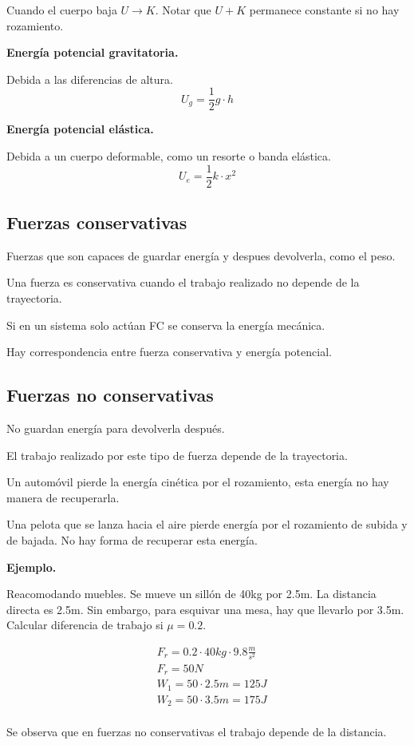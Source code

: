 \documentclass{article}
\begin{document}
Cuando el cuerpo baja \(U \rightarrow K\).
Notar que \(U + K\) permanece constante si no hay rozamiento.

\textbf{Energía potencial gravitatoria.}

Debida a las diferencias de altura.
\[U_g = \frac{1}{2} g \cdot h\]

\textbf{Energía potencial elástica.}

Debida a un cuerpo deformable, como un resorte o banda elástica.
\[U_e = \frac{1}{2} k \cdot x^2\]

\subsection{Fuerzas conservativas}

Fuerzas que son capaces de guardar energía y despues devolverla, como el peso.

Una fuerza es conservativa cuando el trabajo realizado no depende de la trayectoria.

Si en un sistema solo actúan FC se conserva la energía mecánica.

Hay correspondencia entre fuerza conservativa y energía potencial.

\subsection{Fuerzas no conservativas}

No guardan energía para devolverla después.

El trabajo realizado por este tipo de fuerza depende de la trayectoria.

Un automóvil pierde la energía cinética por el rozamiento,
esta energía no hay manera de recuperarla.

Una pelota que se lanza hacia el aire pierde energía por el rozamiento de subida y de bajada.
No hay forma de recuperar esta energía.

\textbf{Ejemplo.}

Reacomodando muebles.
Se mueve un sillón de 40kg por 2.5m.
La distancia directa es 2.5m.
Sin embargo, para esquivar una mesa, hay que llevarlo por 3.5m.
Calcular diferencia de trabajo si \(\mu = 0.2\).

\begin{align*}
     & F_r = 0.2 \cdot 40kg \cdot 9.8\frac{m}{s^2} \\
     & F_r = 50N                                   \\
     & W_1 = 50 \cdot 2.5m = 125J                  \\
     & W_2 = 50 \cdot 3.5m = 175J                  \\
\end{align*}

Se observa que en fuerzas no conservativas el trabajo depende de la distancia.
\end{document}
